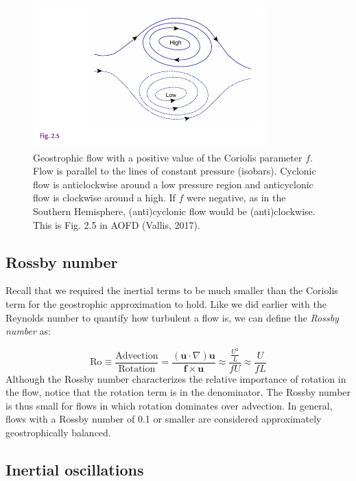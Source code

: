 \documentclass[12pt]{article}
\numberwithin{equation}{section}
\numberwithin{figure}{section}
\numberwithin{table}{section}
\begin{document}
\begin{figure}[h]
  \centering
  \includegraphics[width=0.8\textwidth]{assets/fig_geostrophic_balance.pdf}
  \caption{
    Geostrophic flow with a positive value of the Coriolis parameter $f$.
    Flow is parallel to the lines of constant pressure (isobars).
    Cyclonic flow is anticlockwise around a low pressure region and
    anticyclonic flow is clockwise around a high. If $f$ were negative, as in
    the Southern Hemisphere, (anti)cyclonic flow would be (anti)clockwise.
    This is Fig. 2.5 in AOFD (Vallis, 2017).
  }
  \label{fig:geostrophic_flow}
\end{figure}

\subsection{Rossby number}

Recall that we required the inertial terms to be much smaller than the Coriolis
term for the geostrophic approximation to hold.
Like we did earlier with the Reynolds number to quantify how turbulent a flow is,
we can define the \textit{Rossby number} as:

\begin{equation}
  \text{Ro} \equiv
  \frac{\text{Advection}}{\text{Rotation}} = 
  \frac{\left( \mathbf{u} \cdot \nabla \right) \mathbf{u}}{\mathbf{f} \times \mathbf{u}}
  \approx \frac{\frac{U^2}{L}}{fU}
  \approx \frac{U}{fL}
\end{equation}
Although the Rossby number characterizes the relative importance of rotation in
the flow, notice that the rotation term is in the denominator.
The Rossby number is thus small for flows in which rotation dominates over
advection.
In general, flows with a Rossby number of 0.1 or smaller are considered
approximately geostrophically balanced.

\subsection{Inertial oscillations}
\label{sec:inertial_oscillations}
\end{document}
